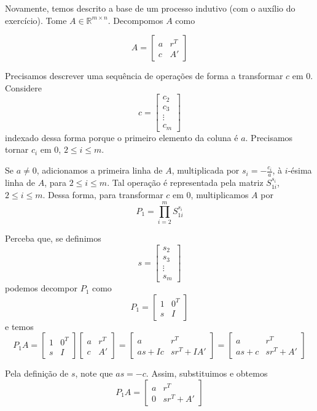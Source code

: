\documentclass[]{article}
\numberwithin{equation}{section}
\begin{document}
Novamente, temos descrito a base de um processo indutivo (com o auxílio do exercício). Tome $A \in \mathbb{R}^{m \times n}$. Decompomos $A$ como

$$
A =
\begin{bmatrix}
a & r^T \\
c & A'
\end{bmatrix}
$$

Precisamos descrever uma sequência de operações de forma a transformar $c$ em 0. Considere
$$
c =
\begin{bmatrix}
c_2 \\
c_3 \\
\vdots \\
c_m
\end{bmatrix}
$$
indexado dessa forma porque o primeiro elemento da coluna é $a$. Precisamos tornar $c_i$ em 0, $2 \leq i \leq m$.

Se $a \neq 0$, adicionamos a primeira linha de $A$, multiplicada por $s_i = -\frac{c_i}{a}$, à $i$-ésima linha de $A$, para $2 \leq i \leq m$. Tal operação é representada pela matriz $S_{1i}^{s_i}$, $2 \leq i \leq m$. Dessa forma, para transformar $c$ em 0, multiplicamos $A$ por
$$
P_1 = \prod_{i = 2}^m S_{1i}^{s_i}
$$

Perceba que, se definimos
$$
s =
\begin{bmatrix}
s_2 \\
s_3 \\
\vdots \\
s_m
\end{bmatrix}
$$
podemos decompor $P_1$ como
$$
P_1 =
\begin{bmatrix}
1 & 0^T \\
s & I
\end{bmatrix}
$$
e temos
$$
P_1A =
\begin{bmatrix}
1 & 0^T \\
s & I
\end{bmatrix}
\begin{bmatrix}
a & r^T \\
c & A'
\end{bmatrix}
=
\begin{bmatrix}
a & r^T \\
as + Ic & sr^T + IA'
\end{bmatrix}
=
\begin{bmatrix}
a & r^T \\
as + c & sr^T + A'
\end{bmatrix}
$$

Pela definição de $s$, note que $as = -c$. Assim, substituimos e obtemos
$$
P_1A =
\begin{bmatrix}
a & r^T \\
0 & sr^T + A'
\end{bmatrix}
$$
\end{document}
